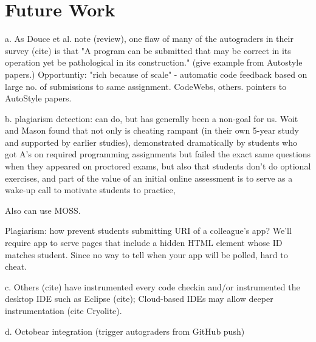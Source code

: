 \section{Future Work}



a.	As Douce et al. note (review), one flaw of many of the autograders in their survey (cite) is that "A program can be submitted that may be correct in its operation yet be pathological in its construction." (give example from Autostyle papers.) Opportuntiy: "rich because of scale" - automatic code feedback based on large no. of submissions to same assignment.  CodeWebs, others. pointers to AutoStyle papers.

b.	plagiarism detection: can do, but has generally been a non-goal for us. Woit and Mason found that not only is cheating rampant (in their own 5-year study and supported by earlier studies), demonstrated dramatically by students who got A's on required programming assignments but failed the exact same questions when they appeared on proctored exams, but  also that students don't do optional exercises, and part of the value of an initial online assessment is to serve as a wake-up call to motivate students to practice,

Also can use MOSS.

Plagiarism: how prevent students submitting URI of a colleague's app?
We'll require app to serve pages that include a hidden HTML element
whose ID matches student.  Since no way to tell when your app will be
polled, hard to cheat.


c.	Others (cite) have instrumented every code checkin and/or instrumented the desktop IDE  such as Eclipse (cite); Cloud-based IDEs may allow deeper instrumentation (cite Cryolite).

d.	Octobear integration (trigger autograders from GitHub push)



